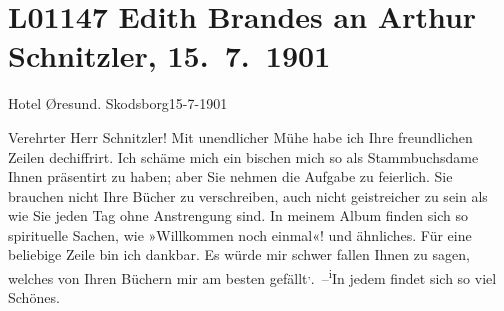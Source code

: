 

\section[Edith Brandes an Arthur Schnitzler, 15. 7. 1901]{L01147 Edith Brandes an Arthur Schnitzler, 15. 7. 1901}
\nopagebreak{}
\rehead{ }\normalsize\beginnumbering{}
\toendnotes[C]{\smallbreak\pagebreak[2]}
\toendnotes[C]{\smallbreak}
\toendnotes[C]{\smallbreak}
\pstart
           \raggedleft{}{\pb}Hotel Øresund. Skodsborg15-7-1901\pend
           
\pstart\center{}Verehrter Herr Schnitzler!\pend\vspace{0.5em}
\pstart
           Mit unendlicher Mühe habe ich Ihre freundlichen Zeilen dechiffrirt. Ich schäme mich
               ein bischen mich so als Stammbuchsdame Ihnen präsentirt zu haben; aber Sie nehmen die
               Aufgabe {\pb}zu feierlich. Sie
               brauchen nicht Ihre Bücher zu verschreiben, auch nicht geistreicher zu sein als wie
               Sie jeden Tag ohne Anstrengung sind. In meinem Album finden sich so spirituelle
               Sachen, wie »Willkommen noch einmal«! und ähnliches. Für eine beliebige Zeile bin ich
               dankbar. Es würde mir schwer fallen Ihnen zu sagen, welches von Ihren Büchern mir am
               besten gefällt\substVorne{}\textsuperscript{,}\substDazwischen{}. –\substHinten{}{ }\substVorne{}\textsuperscript{i}\substDazwischen{}I\substHinten{}n jedem findet sich so viel Schönes.\pend
           
